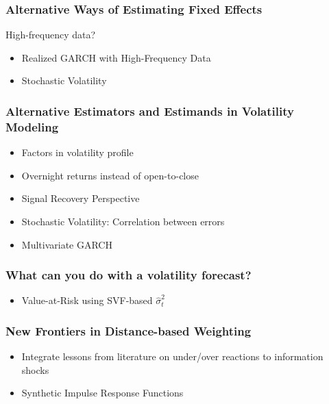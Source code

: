 \documentclass[9pt]{beamer}
\theoremstyle{definition}
\begin{document}
\begin{frame}
\frametitle{Alternative Ways of Estimating Fixed Effects}
High-frequency data?

\begin{itemize}

\item{Realized GARCH with High-Frequency Data}

\item{Stochastic Volatility}
\end{itemize}
\end{frame}

\begin{frame}
    \frametitle{Alternative Estimators and Estimands in Volatility Modeling}
    \begin{itemize}
        
        \item Factors in volatility profile
        \item Overnight returns instead of open-to-close
        
        \item Signal Recovery Perspective \parencite{ferwana2022optimal}
        
        \item Stochastic Volatility: Correlation between errors
        \item Multivariate GARCH
        
        \end{itemize}
\end{frame}

\begin{frame}
    \frametitle{What can you do with a volatility forecast?}
    \begin{itemize}
        \item{Value-at-Risk using SVF-based $\hat\sigma^{2}_{t}$}
        \end{itemize}
\end{frame}

\begin{frame}
    \frametitle{New Frontiers in Distance-based Weighting}
    \begin{itemize}
        \item Integrate lessons from literature on under/over reactions to information shocks \parencite[][]{jiang2017information}
        \item{Synthetic Impulse Response Functions}
        \end{itemize}
\end{frame}
\end{document}
